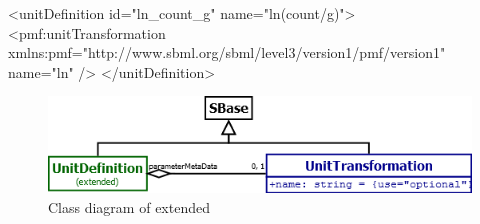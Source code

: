 \begin{example}
<unitDefinition id="ln_count_g" name="ln(count/g)">
  <pmf:unitTransformation xmlns:pmf="http://www.sbml.org/sbml/level3/version1/pmf/version1"
    name="ln" />
</unitDefinition>
\end{example}

\begin{figure}
	\includegraphics[scale=0.7]{img/unitdefinition_uml}
	\caption{Class diagram of extended \UnitDefinition}
	\label{unitdefinition_uml}
\end{figure}
